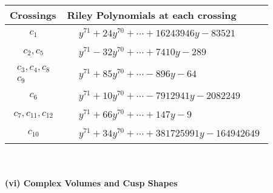 \documentclass[1p]{elsarticle_modified}
\theoremstyle{definition}
\begin{document}
\begin{tabular}{m{50pt}|m{274pt}}
Crossings & \hspace{64pt}Riley Polynomials at each crossing \\
\hline $$\begin{aligned}c_{1}\end{aligned}$$&$\begin{aligned}
&y^{71}+24 y^{70}+\cdots+16243946 y-83521
\end{aligned}$\\
\hline $$\begin{aligned}c_{2},c_{5}\end{aligned}$$&$\begin{aligned}
&y^{71}-32 y^{70}+\cdots+7410 y-289
\end{aligned}$\\
\hline $$\begin{aligned}c_{3},c_{4},c_{8}\\c_{9}\end{aligned}$$&$\begin{aligned}
&y^{71}+85 y^{70}+\cdots-896 y-64
\end{aligned}$\\
\hline $$\begin{aligned}c_{6}\end{aligned}$$&$\begin{aligned}
&y^{71}+10 y^{70}+\cdots-7912941 y-2082249
\end{aligned}$\\
\hline $$\begin{aligned}c_{7},c_{11},c_{12}\end{aligned}$$&$\begin{aligned}
&y^{71}+66 y^{70}+\cdots+147 y-9
\end{aligned}$\\
\hline $$\begin{aligned}c_{10}\end{aligned}$$&$\begin{aligned}
&y^{71}+34 y^{70}+\cdots+381725991 y-164942649
\end{aligned}$\\
\hline
\end{tabular}\\~\\
\newpage\flushleft \textbf{(vi) Complex Volumes and Cusp Shapes}
\end{document}
